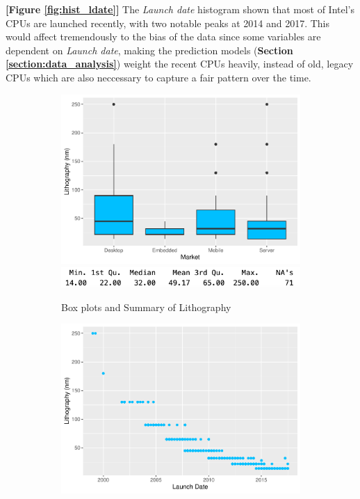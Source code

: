 
\textbf{[Figure \ref{fig:hist_ldate}]} The \textit{Launch date} histogram shown that most of Intel's CPUs are launched recently, 
with two notable peaks at 2014 and 2017. This would affect tremendously to the bias of the data since some variables are dependent 
on \textit{Launch date}, making the prediction models (\textbf{Section \ref{section:data_analysis}}) weight the recent CPUs heavily,
instead of old, legacy CPUs which are also neccessary to capture a fair pattern over the time.






\begin{figure}[H]
    \centering
    \begin{subfigure}[b]{0.49\textwidth}
        \includegraphics[width=\textwidth]{./graphics/box_litho.pdf}
        \includegraphics[width=\textwidth]{./graphics/sum_litho.png}
        \caption{Box plots and Summary of Lithography}
        \label{fig:box_litho}
    \end{subfigure}
    \hfill
    \begin{subfigure}[b]{0.49\textwidth}
        \includegraphics[width=\textwidth]{./graphics/scatter_litho.pdf}

\end{subfigure}
\end{figure}
